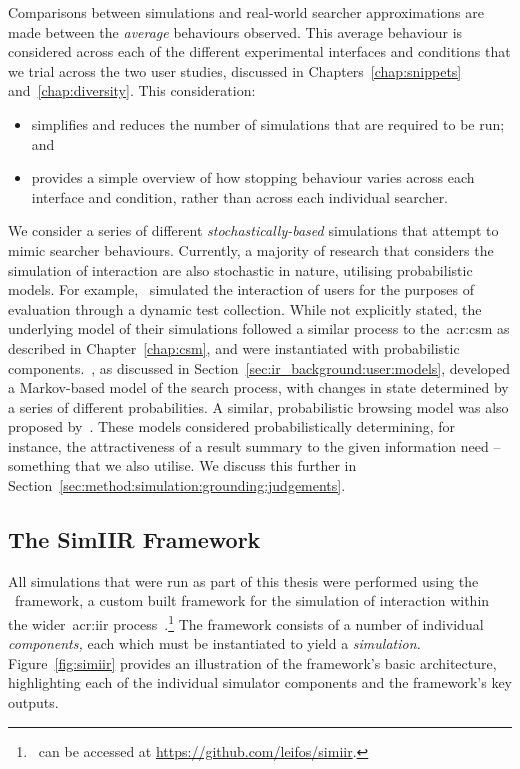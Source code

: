  Comparisons between simulations and real-world searcher approximations are made between the \emph{average} behaviours observed. This average behaviour is considered across each of the different experimental interfaces and conditions that we trial across the two user studies, discussed in Chapters~\ref{chap:snippets} and~\ref{chap:diversity}. This consideration:

\begin{itemize}
    \item{simplifies and reduces the number of simulations that are required to be run; and}
    \item{provides a simple overview of how stopping behaviour varies across each interface and condition, rather than across each individual searcher.}
\end{itemize}

 We consider a series of different \emph{stochastically-based} simulations that attempt to mimic searcher behaviours. Currently, a majority of research that considers the simulation of interaction are also stochastic in nature, utilising probabilistic models. For example,~\cite{carterette2011effectiveness_evaluation} simulated the interaction of users for the purposes of evaluation through a dynamic test collection. While not explicitly stated, the underlying model of their simulations followed a similar process to the~\gls{acr:csm} as described in Chapter~\ref{chap:csm}, and were instantiated with probabilistic components.~\cite{baskaya2013behavioural_factors}, as discussed in Section~\ref{sec:ir_background:user:models}, developed a Markov-based model of the search process, with changes in state determined by a series of different probabilities. A similar, probabilistic browsing model was also proposed by~\cite{yilmaz2010browsing_utility}. These models considered probabilistically determining, for instance, the attractiveness of a result summary to the given information need -- something that we also utilise. We discuss this further in Section~\ref{sec:method:simulation:grounding:judgements}.

\subsection{The SimIIR Framework}\label{sec:method:simulation:simiir}
All simulations that were run as part of this thesis were performed using the \simiir~framework, a custom built framework for the simulation of interaction within the wider~\gls{acr:iir} process~\citep{maxwell2016simiir}.\footnote{\simiir~can be accessed at \url{https://github.com/leifos/simiir}. } The framework consists of a number of individual \emph{components,} each which must be instantiated to yield a \emph{simulation.} Figure~\ref{fig:simiir} provides an illustration of the framework's basic architecture, highlighting each of the individual simulator components and the framework's key outputs.

